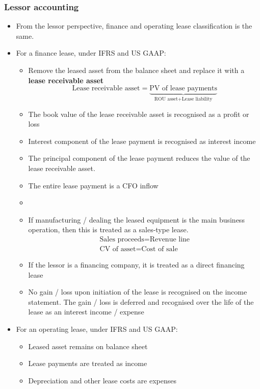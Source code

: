 \documentclass[../notes_compiled.tex]{subfiles}
\begin{document}
\subsubsection{Lessor accounting}
\begin{itemize}
\item From the lessor perspective, finance and operating lease classification is the same.
\item For a finance lease, under IFRS and US GAAP:
\begin{itemize}
\item Remove the leased asset from the balance sheet and replace it with a \textbf{lease receivable asset}
\begin{equation}
\text{Lease receivable asset} = \underbrace{\text{PV of lease payments}}_{\text{ROU asset} + \text{Lease liability}}
\end{equation}
\item The book value of the lease receivable asset is recognised as a profit or loss
\item Interest component of the lease payment is recognised as interest income
\item The principal component of the lease payment reduces the value of the lease receivable asset.
\item The entire lease payment is a CFO inflow
\item[]
\item If manufacturing / dealing the leased equipment is the main business operation, then this is treated as a sales-type lease. 
\begin{gather*}
\text{Sales proceeds} = \text{Revenue line} \\
\text{CV of asset} = \text{Cost of sale}
\end{gather*}
\item If the lessor is a financing company, it is treated as a direct financing lease
\item No gain / loss upon initiation of the lease is recognised on the income statement. The gain / loss is deferred and recognised over the life of the lease as an interest income / expense
\end{itemize}
\item For an operating lease, under IFRS and US GAAP:
\begin{itemize}
\item Leased asset remains on balance sheet
\item Lease payments are treated as income
\item Depreciation and other lease costs are expenses

\end{itemize}
\end{itemize}
\end{document}
